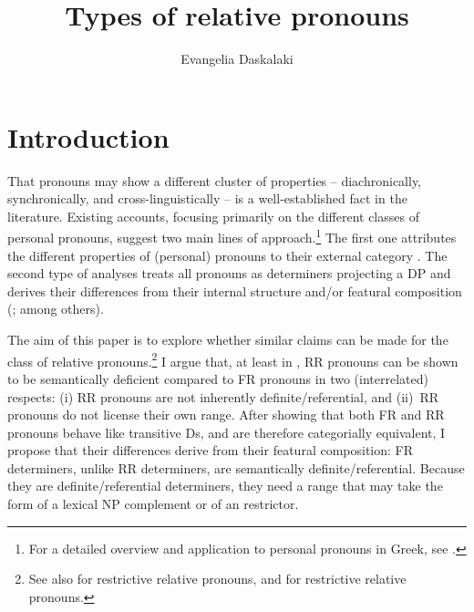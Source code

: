 \documentclass[output=paper]{langsci/langscibook}
\author{Evangelia Daskalaki\affiliation{University of Alberta}}
\title{Types of relative pronouns}
\begin{document}
\glsresetall
\maketitle


\section{Introduction}\label{sec:01.1}

That pronouns may show a different cluster of properties -- diachronically,
synchronically, and cross-linguistically -- is a well-established fact in the
literature. Existing accounts, focusing primarily on the different classes of
personal pronouns, suggest two main lines of approach.\footnote{For a detailed
overview and application to personal pronouns in Greek, see
\citet{Mavrogiorgos2010}.} The first one attributes the different properties of
(personal) pronouns to their external category
\parencite{CarSta1999,DecWil2002}. The second type of analyses treats all
pronouns as determiners projecting a DP and derives their differences from
their internal structure and/or featural composition
(\citealt{Abney1987,Cardinaletti1994,Uriagereka1995}; among others).

The aim of this paper is to explore whether similar claims can be made for the
class of relative pronouns.\footnote{See also \citet{Sportiche2011} for
     restrictive relative pronouns, and \citet{Wiltschko1998} for
 restrictive relative pronouns.} I argue that, at least in
, \gls{RR} pronouns can be shown to be semantically deficient
compared to \gls{FR} pronouns in two (interrelated) respects: (i) \gls{RR}
pronouns are not inherently definite/referential, and (ii)~\gls{RR} pronouns do
not license their own range. After showing that both \gls{FR} and \gls{RR}
pronouns behave like transitive Ds, and are therefore categorially equivalent,
I propose that their differences derive from their featural composition:
\gls{FR} determiners, unlike \gls{RR} determiners, are semantically
definite/referential. Because they are definite/referential determiners, they
need a range that may take the form of a lexical NP complement or of an 
restrictor.
\end{document}
